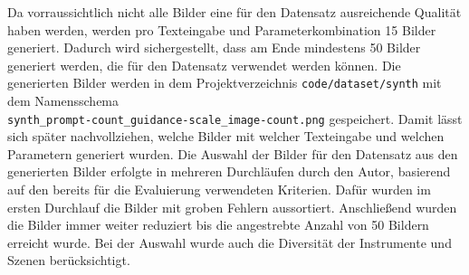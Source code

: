 Da vorraussichtlich nicht alle Bilder eine für den Datensatz ausreichende Qualität haben werden, werden pro Texteingabe und Parameterkombination 15 Bilder generiert.
Dadurch wird sichergestellt, dass am Ende mindestens 50 Bilder generiert werden, die für den Datensatz verwendet werden können. Die generierten Bilder werden in dem Projektverzeichnis \texttt{code/dataset/synth} mit dem Namensschema \\ \texttt{synth\_prompt-count\_guidance-scale\_image-count.png} gespeichert.
Damit lässt sich später nachvollziehen, welche Bilder mit welcher Texteingabe und welchen Parametern generiert wurden. 
Die Auswahl der Bilder für den Datensatz aus den generierten Bilder erfolgte in mehreren Durchläufen durch den Autor, basierend auf den bereits für die Evaluierung verwendeten Kriterien. Dafür wurden im ersten Durchlauf die Bilder mit groben Fehlern aussortiert. Anschließend wurden die Bilder immer weiter reduziert bis die angestrebte Anzahl von 50 Bildern erreicht wurde. Bei der Auswahl wurde auch die Diversität der Instrumente und Szenen berücksichtigt.
